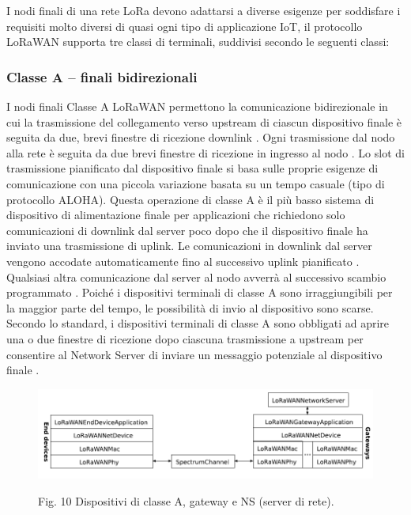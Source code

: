\documentclass[a4paper]{report} %
\begin{document}
I nodi finali di una rete LoRa devono adattarsi a diverse esigenze per soddisfare i requisiti molto diversi di quasi ogni tipo di applicazione IoT, il protocollo LoRaWAN supporta tre classi di terminali, suddivisi secondo le seguenti classi:
\subsubsection{Classe A – finali bidirezionali}
I nodi finali Classe A LoRaWAN permettono la comunicazione bidirezionale \cite{art:rif.27} in cui la trasmissione del collegamento verso upstream di ciascun dispositivo finale è seguita da due, brevi finestre di ricezione downlink \cite{art:rif.31}. Ogni trasmissione dal nodo alla rete è seguita da due brevi finestre di ricezione in ingresso al nodo \cite{art:rif.27}. Lo slot di trasmissione pianificato dal dispositivo finale si basa sulle proprie esigenze di comunicazione con una piccola variazione basata su un tempo casuale (tipo di protocollo ALOHA). Questa operazione di classe A è il più basso sistema di dispositivo di alimentazione finale per applicazioni che richiedono solo comunicazioni di downlink dal server poco dopo che il dispositivo finale ha inviato una trasmissione di uplink. Le comunicazioni in downlink dal server vengono accodate automaticamente fino al successivo uplink pianificato \cite{art:rif.31}. Qualsiasi altra comunicazione dal server al nodo avverrà al successivo scambio programmato \cite{art:rif.27}. Poiché i dispositivi terminali di classe A sono irraggiungibili per la maggior parte del tempo, le possibilità di invio al dispositivo sono scarse. Secondo lo standard, i dispositivi terminali di classe A sono obbligati ad aprire una o due finestre di ricezione dopo ciascuna trasmissione a upstream per consentire al Network Server di inviare un messaggio potenziale al dispositivo finale \cite{art:rif.49}. 
\begin{figure}
\centering
\includegraphics[scale=.5]{Immagini/ClasseA.png}

Fig. 10 Dispositivi di classe A, gateway e NS (server di rete).
\end{figure}
\end{document}
